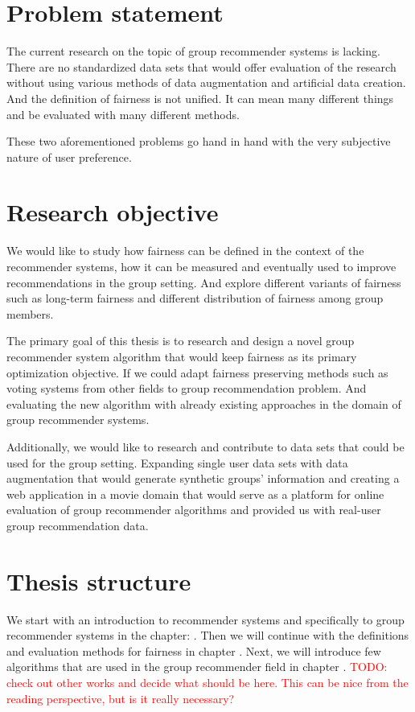 \section{Problem statement}
The current research on the topic of group recommender systems is lacking. There are no standardized data sets that would offer evaluation of the research without using various methods of data augmentation and artificial data creation.
And the definition of fairness is not unified. It can mean many different things and be evaluated with many different methods.

These two aforementioned problems go hand in hand with the very subjective nature of user preference.

\section{Research objective}

We would like to study how fairness can be defined in the context of the recommender systems, how it can be measured and eventually used to improve recommendations in the group setting. And explore different variants of fairness such as long-term fairness and different distribution of fairness among group members. 

The primary goal of this thesis is to research and design a novel group recommender system algorithm that would keep fairness as its primary optimization objective. If we could adapt fairness preserving methods such as voting systems from other fields to group recommendation problem. And evaluating the new algorithm with already existing approaches in the domain of group recommender systems.

Additionally, we would like to research and contribute to data sets that could be used for the group setting. Expanding single user data sets with data augmentation that would generate synthetic groups' information and creating a web application in a movie domain that would serve as a platform for online evaluation of group recommender algorithms and provided us with real-user group recommendation data.

\section{Thesis structure}

We start with an introduction to recommender systems and specifically to group recommender systems in the chapter: . Then we will continue with the definitions and evaluation methods for fairness in chapter . Next, we will introduce few algorithms that are used in the group recommender field in chapter .
\textcolor{red}{TODO: check out other works and decide what should be here. This can be nice from the reading perspective, but is it really necessary?}


